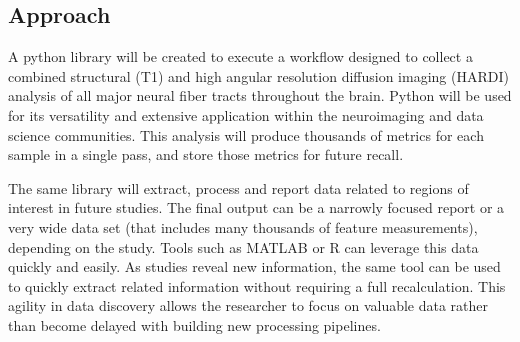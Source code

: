 \subsection {Approach}

A python library will be created to execute a workflow designed to collect a 
combined structural (T1) and high angular resolution diffusion imaging (HARDI) 
analysis of all major neural fiber tracts throughout the brain.  Python will be 
used for its versatility and extensive application within the neuroimaging and 
data science communities.  This analysis will produce thousands of metrics for 
each sample in a single pass, and store those metrics for future recall.

The same library will extract, process and report data related to regions of 
interest in future studies.  The final output can be a narrowly focused report 
or a very wide data set (that includes many thousands of feature measurements), 
depending on the study.  Tools such as MATLAB or R can leverage this data 
quickly and easily.  As studies reveal new information, the same tool can be 
used to quickly extract related information without requiring a full 
recalculation.  This agility in data discovery allows the researcher to focus on 
valuable data rather than become delayed with building new processing pipelines.

